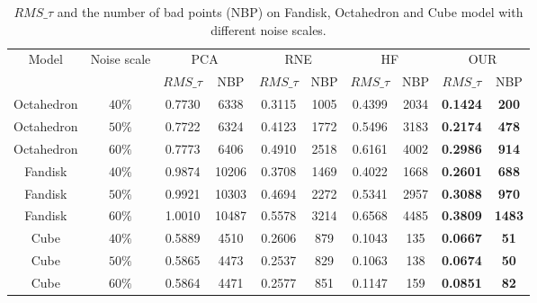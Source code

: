 \begin{table*}
\centering
\caption{\label{tab:Computational_Statistics}$RMS\_\tau$ and the number of bad points (NBP) on Fandisk, Octahedron  and Cube model with different noise scales.}
\begin{tabular}{|c|c|c|c|c|c|c|c|c|c|}
\hline
\multirow{2}{*}{Model} & \multirow{2}{*}{Noise scale} & \multicolumn{2}{|c}{PCA} & \multicolumn{2}{|c}{RNE} & \multicolumn{2}{|c}{HF} & \multicolumn{2}{|c|}{OUR} \\
\cline{3-10}
  & & $RMS\_\tau$ & NBP & $RMS\_\tau $ & NBP & $RMS\_\tau $ & NBP & $RMS\_\tau $ & NBP\\
\hline \hline
 Octahedron & $40\%$ & 0.7730 & 6338 & 0.3115 & 1005 & 0.4399 & 2034 & \textbf{0.1424} & \textbf{200} \\
 Octahedron & $50\%$ & 0.7722 & 6324 & 0.4123 & 1772 & 0.5496 & 3183 & \textbf{0.2174} & \textbf{478} \\
 Octahedron & $60\%$ & 0.7773 & 6406 & 0.4910 & 2518 & 0.6161 & 4002& \textbf{0.2986} & \textbf{914} \\
 Fandisk & $40\%$ & 0.9874 & 10206 & 0.3708 & 1469 & 0.4022 & 1668 & \textbf{0.2601} & \textbf{688} \\
 Fandisk & $50\%$ & 0.9921 & 10303 & 0.4694 & 2272 & 0.5341 & 2957 & \textbf{0.3088} & \textbf{970} \\
 Fandisk & $60\%$ & 1.0010 & 10487 & 0.5578 & 3214 & 0.6568 & 4485 & \textbf{0.3809} & \textbf{1483} \\
 Cube & $40\%$ & 0.5889 & 4510 & 0.2606 & 879 & 0.1043 & 135 & \textbf{0.0667} & \textbf{51} \\
 Cube & $50\%$ & 0.5865 & 4473 & 0.2537 & 829 & 0.1063 & 138 & \textbf{0.0674} & \textbf{50} \\
 Cube & $60\%$ & 0.5864 & 4471 & 0.2577 & 851 & 0.1147 & 159 & \textbf{0.0851} & \textbf{82} \\
\hline
\end{tabular}
\end{table*}

